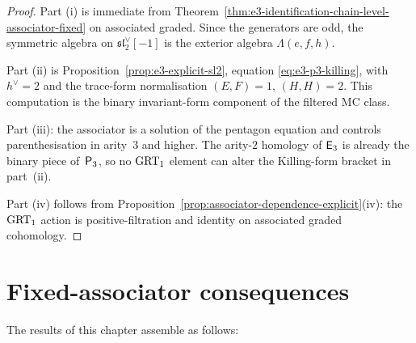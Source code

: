 \begin{proof}
Part (i) is immediate from
Theorem~\ref{thm:e3-identification-chain-level-associator-fixed}
on associated graded. Since the generators are odd, the symmetric
algebra on $\mathfrak{sl}_2^\vee[-1]$ is the exterior algebra
$\Lambda(e,f,h)$.

Part (ii) is Proposition~\ref{prop:e3-explicit-sl2}, equation
\eqref{eq:e3-p3-killing}, with $h^\vee=2$ and the trace-form
normalisation $(E,F)=1$, $(H,H)=2$. This computation is the
binary invariant-form component of the filtered MC class.

Part (iii): the associator is a solution of the pentagon equation
and controls parenthesisation in arity~$3$ and higher. The arity-$2$
homology of $\mathsf{E}_3$ is already the binary piece of~$\mathsf{P}_3$,
so no $\mathrm{GRT}_1$ element can alter the Killing-form bracket in
part~\textup{(ii)}.

Part (iv) follows from
Proposition~\ref{prop:associator-dependence-explicit}(iv):
the $\mathrm{GRT}_1$ action is positive-filtration and identity on
associated graded cohomology.
\end{proof}

\section{Fixed-associator consequences}
\label{sec:synthesis}

The results of this chapter assemble as follows:

